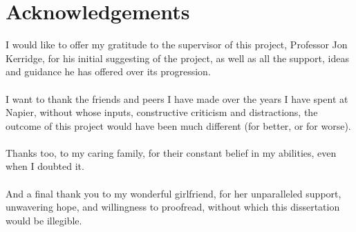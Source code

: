 \newpage
\section*{Acknowledgements}
	\noindent
	I would like to offer my gratitude to the supervisor of this project, Professor Jon Kerridge, for his initial suggesting of the project, as well as all the support, ideas and guidance he has offered over its progression.
	\\\\
	I want to thank the friends and peers I have made over the years I have spent at Napier, without whose inputs, constructive criticism and distractions, the outcome of this project would have been much different (for better, or for worse).
	\\\\
	Thanks too, to my caring family, for their constant belief in my abilities, even when I doubted it.
	\\\\
	And a final thank you to my wonderful girlfriend, for her unparalleled support, unwavering hope, and willingness to proofread, without which this dissertation would be illegible.
	\newpage
